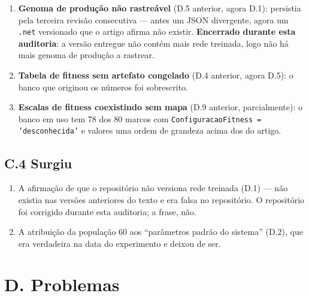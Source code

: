\documentclass[11pt,a4paper]{article}
\begin{document}
\begin{enumerate}
  \item \textbf{Genoma de produção não rastreável} (D.5 anterior, agora D.1): persistia pela terceira
  revisão consecutiva --- antes um JSON divergente, agora um \texttt{.net} versionado que o artigo
  afirma não existir. \textbf{Encerrado durante esta auditoria}: a versão entregue não contém mais
  rede treinada, logo não há mais genoma de produção a rastrear.
  \item \textbf{Tabela de fitness sem artefato congelado} (D.4 anterior, agora D.5): o banco que
  originou os números foi sobrescrito.
  \item \textbf{Escalas de fitness coexistindo sem mapa} (D.9 anterior, parcialmente): o banco em uso
  tem 78 dos 80 marcos com \texttt{ConfiguracaoFitness = 'desconhecida'} e valores uma ordem de
  grandeza acima dos do artigo.
\end{enumerate}

\subsection*{C.4 Surgiu}

\begin{enumerate}
  \item A afirmação de que o repositório não versiona rede treinada (D.1) --- não existia nas versões
  anteriores do texto e era falsa no repositório. O repositório foi corrigido durante esta auditoria;
  a frase, não.
  \item A atribuição da população 60 aos ``parâmetros padrão do sistema'' (D.2), que era verdadeira na
  data do experimento e deixou de ser.
\end{enumerate}

\section*{D. Problemas}
\end{document}
